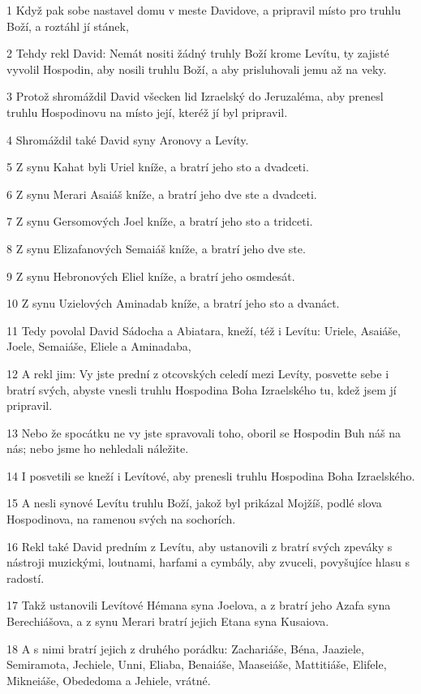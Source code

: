 \par 1 Když pak sobe nastavel domu v meste Davidove, a pripravil místo pro truhlu Boží, a roztáhl jí stánek,
\par 2 Tehdy rekl David: Nemát nositi žádný truhly Boží krome Levítu, ty zajisté vyvolil Hospodin, aby nosili truhlu Boží, a aby prisluhovali jemu až na veky.
\par 3 Protož shromáždil David všecken lid Izraelský do Jeruzaléma, aby prenesl truhlu Hospodinovu na místo její, kteréž jí byl pripravil.
\par 4 Shromáždil také David syny Aronovy a Levíty.
\par 5 Z synu Kahat byli Uriel kníže, a bratrí jeho sto a dvadceti.
\par 6 Z synu Merari Asaiáš kníže, a bratrí jeho dve ste a dvadceti.
\par 7 Z synu Gersomových Joel kníže, a bratrí jeho sto a tridceti.
\par 8 Z synu Elizafanových Semaiáš kníže, a bratrí jeho dve ste.
\par 9 Z synu Hebronových Eliel kníže, a bratrí jeho osmdesát.
\par 10 Z synu Uzielových Aminadab kníže, a bratrí jeho sto a dvanáct.
\par 11 Tedy povolal David Sádocha a Abiatara, kneží, též i Levítu: Uriele, Asaiáše, Joele, Semaiáše, Eliele a Aminadaba,
\par 12 A rekl jim: Vy jste prední z otcovských celedí mezi Levíty, posvette sebe i bratrí svých, abyste vnesli truhlu Hospodina Boha Izraelského tu, kdež jsem jí pripravil.
\par 13 Nebo že spocátku ne vy jste spravovali toho, oboril se Hospodin Buh náš na nás; nebo jsme ho nehledali náležite.
\par 14 I posvetili se kneží i Levítové, aby prenesli truhlu Hospodina Boha Izraelského.
\par 15 A nesli synové Levítu truhlu Boží, jakož byl prikázal Mojžíš, podlé slova Hospodinova, na ramenou svých na sochorích.
\par 16 Rekl také David predním z Levítu, aby ustanovili z bratrí svých zpeváky s nástroji muzickými, loutnami, harfami a cymbály, aby zvuceli, povyšujíce hlasu s radostí.
\par 17 Takž ustanovili Levítové Hémana syna Joelova, a z bratrí jeho Azafa syna Berechiášova, a z synu Merari bratrí jejich Etana syna Kusaiova.
\par 18 A s nimi bratrí jejich z druhého porádku: Zachariáše, Béna, Jaaziele, Semiramota, Jechiele, Unni, Eliaba, Benaiáše, Maaseiáše, Mattitiáše, Elifele, Mikneiáše, Obededoma a Jehiele, vrátné.

